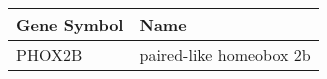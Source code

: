 \begin{tabular}{ll}
\toprule
Gene Symbol &                    Name \\
\midrule
     PHOX2B & paired-like homeobox 2b \\
\bottomrule
\end{tabular}
